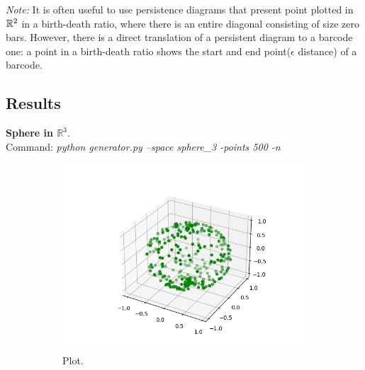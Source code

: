 \documentclass[11pt,a4paper]{report}
\begin{document}
            
            \emph{Note:} It is often useful to use persistence diagrams that present point plotted in $\mathbb{R}^2$ in a birth-death ratio, where there is an entire diagonal consisting of size zero bars. However, there is a direct translation of a persistent diagram to a barcode one: a point in a birth-death ratio shows the start and end point($\epsilon$ distance) of a barcode.
            
            \subsection*{Results}
            \textbf{Sphere in $\mathbb{R}^3$}.\\
              Command: \textit{python generator.py --space sphere\_3 -points 500 -n}

              \begin{figure}[H]
                \centering
                \begin{subfigure}[b]{0.45\linewidth}
                  \includegraphics[width=\linewidth]{./ripser/on_sphere.PNG}
                  \caption{Plot.}
                \end{subfigure}
                \begin{subfigure}[b]{0.45\linewidth}

\end{subfigure}
\end{figure}
\end{document}
